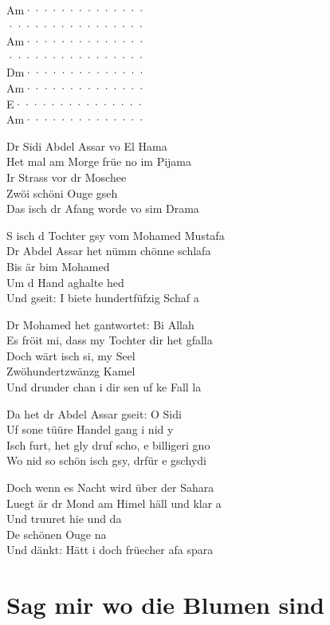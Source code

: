 \documentclass[
  letterpaper,
  twoside=false]{scrbook}
\begin{document}
\textbar Am······\textbar········\textbar{}\\
\textbar········\textbar········\textbar{}\\
\textbar Am······\textbar········\textbar{}\\
\textbar········\textbar········\textbar{}\\
\textbar Dm······\textbar········\textbar{}\\
\textbar Am······\textbar········\textbar{}\\
\textbar E·······\textbar········\textbar{}\\
\textbar Am······\textbar········\textbar{}

Dr Sidi Abdel Assar vo El Hama\\
Het mal am Morge früe no im Pijama\\
Ir Strass vor dr Moschee\\
Zwöi schöni Ouge gseh\\
Das isch dr Afang worde vo sim Drama

S isch d Tochter gsy vom Mohamed Mustafa\\
Dr Abdel Assar het nümm chönne schlafa\\
Bis är bim Mohamed\\
Um d Hand aghalte hed\\
Und gseit: I biete hundertfüfzig Schaf a

Dr Mohamed het gantwortet: Bi Allah\\
Es fröit mi, dass my Tochter dir het gfalla\\
Doch wärt isch si, my Seel\\
Zwöhundertzwänzg Kamel\\
Und drunder chan i dir sen uf ke Fall la

Da het dr Abdel Assar gseit: O Sidi\\
Uf sone tüüre Handel gang i nid y\\
Isch furt, het gly druf scho, e billigeri gno\\
Wo nid so schön isch gsy, drfür e gschydi

Doch wenn es Nacht wird über der Sahara\\
Luegt är dr Mond am Himel häll und klar a\\
Und truuret hie und da\\
De schönen Ouge na\\
Und dänkt: Hätt i doch früecher afa spara

\hypertarget{sag-mir-wo-die-blumen-sind}{%
\chapter{Sag mir wo die Blumen sind}\label{sag-mir-wo-die-blumen-sind}}
\end{document}
